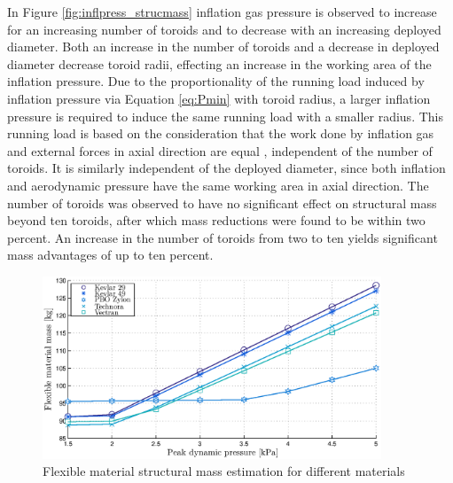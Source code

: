 In Figure \ref{fig:inflpress_strucmass} inflation gas pressure is observed to increase for an increasing number of toroids and to decrease with an increasing deployed diameter. Both an increase in the number of toroids and a decrease in deployed diameter decrease toroid radii, effecting an increase in the working area of the inflation pressure. Due to the proportionality of the running load induced by inflation pressure via Equation \ref{eq:Pmin} with toroid radius, a larger inflation pressure is required to induce the same running load with a smaller radius. This running load is based on the consideration that the work done by inflation gas and external forces in axial direction are equal \cite{Brown2009}, independent of the number of toroids. It is similarly independent of the deployed diameter, since both inflation and aerodynamic pressure have the same working area in axial direction.
The number of toroids was observed to have no significant effect on structural mass beyond ten toroids, after which mass reductions were found to be within two percent. An increase in the number of toroids from two to ten yields significant mass advantages of up to ten percent. 

\begin{figure}[h]
	\centering
	\includegraphics[width=0.9\textwidth]{./Figure/Structure/material_test2.eps}
	\caption{Flexible material structural mass estimation for different materials}
	\label{fig:mat}
\end{figure}
\vspace{-4mm}

